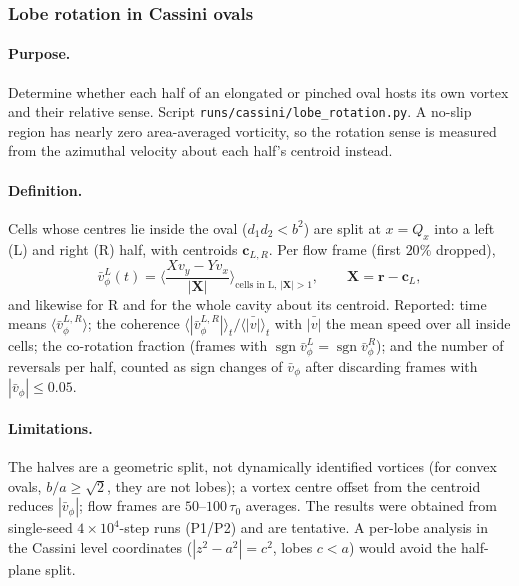 \subsubsection{Lobe rotation in Cassini ovals}
\label{sec:md-lobes}

\paragraph{Purpose.} Determine whether each half of an elongated or pinched oval hosts its own vortex and their relative sense.
Script \texttt{runs/cassini/lobe\_rotation.py}. A no-slip region has nearly zero area-averaged vorticity, so the rotation sense is measured
from the azimuthal velocity about each half's centroid instead.
\paragraph{Definition.} Cells whose centres lie inside the oval ($d_1d_2<b^2$) are split at $x=Q_x$ into a left (L) and right (R) half,
with centroids $\mathbf c_{L,R}$. Per flow frame (first $20\%$ dropped),
\begin{equation}
  \bar v_\phi^{L}(t)=\Big\langle\frac{X v_y-Y v_x}{|\mathbf X|}\Big\rangle_{\text{cells in L},\,|\mathbf X|>1},\qquad \mathbf X=\mathbf r-\mathbf c_L,
\end{equation}
and likewise for R and for the whole cavity about its centroid. Reported: time means $\langle\bar v^{L,R}_\phi\rangle$; the coherence
$\langle|\bar v_\phi^{L,R}|\rangle_t/\langle\bar{|v|}\rangle_t$ with $\bar{|v|}$ the mean speed over all inside cells; the co-rotation fraction
(frames with $\operatorname{sgn}\bar v_\phi^L=\operatorname{sgn}\bar v_\phi^R$); and the number of reversals per half, counted as sign changes
of $\bar v_\phi$ after discarding frames with $|\bar v_\phi|\le0.05$.
\paragraph{Limitations.} The halves are a geometric split, not dynamically identified vortices (for convex ovals, $b/a\ge\sqrt2$, they are not
lobes); a vortex centre offset from the centroid reduces $|\bar v_\phi|$; flow frames are $50$--$100\,\tau_0$ averages. The results were
obtained from single-seed $4\times10^4$-step runs (P1/P2) and are tentative. A per-lobe analysis in the Cassini level coordinates
($|z^2-a^2|=c^2$, lobes $c<a$) would avoid the half-plane split.
